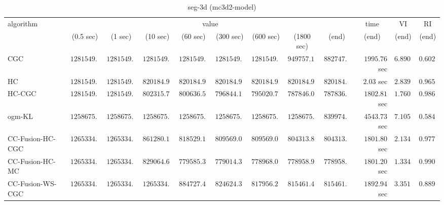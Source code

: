 \begin{table}[H]
\scriptsize
\centering
\caption{seg-3d (mc3d2-model)}
\label{tab:anytimetable-seg-3d-mc3d2-model}
\begin{tabular}{lrrrrrrrrrrr}
\toprule
           algorithm &                                   \multicolumn{8}{c}{value} & \multicolumn{1}{c}{time}    & \multicolumn{1}{c}{VI}  & \multicolumn{1}{c}{RI} \\  
\cmidrule(lr){2-9}\cmidrule(lr){10-10} \cmidrule(lr){11-11} \cmidrule(lr){12-12}   
                     & \multicolumn{1}{c}{(0.5 sec)} & \multicolumn{1}{c}{(1 sec)} & \multicolumn{1}{c}{(10 sec)} & \multicolumn{1}{c}{(60 sec)} & \multicolumn{1}{c}{(300 sec)} & \multicolumn{1}{c}{(600 sec)} & \multicolumn{1}{c}{(1800 sec)} & \multicolumn{1}{c}{(end)} & \multicolumn{1}{c}{(end)}    & \multicolumn{1}{c}{(end)}   & \multicolumn{1}{c}{(end)}  \\ \midrule 
                 CGC & $   1281549.37$ & $   1281549.37$ & $   1281549.37$ & $   1281549.37$ & $   1281549.37$ & $   1281549.37$ & $    949757.11$ & $    882747.02$ & $      1995.76$ sec    & $       6.8908$  & $       0.6024$ \\ 
                  HC & $   1281549.37$ & $   1281549.37$ & $    820184.98$ & $    820184.98$ & $    820184.98$ & $    820184.98$ & $    820184.98$ & $    820184.98$ & $         2.03$ sec    & $       2.8395$  & $       0.9651$ \\ 
              HC-CGC & $   1281549.37$ & $   1281549.37$ & $    802315.77$ & $    800636.51$ & $    796844.12$ & $    795020.78$ & $    787846.06$ & $    787836.19$ & $      1802.81$ sec    & $       1.7603$  & $       0.9861$ \\ 
              ogm-KL & $   1258675.53$ & $   1258675.53$ & $   1258675.53$ & $   1258675.53$ & $   1258675.53$ & $   1258675.53$ & $   1258675.53$ & $    839974.05$ & $      4543.73$ sec    & $       7.1057$  & $       0.5849$ \\ 
    CC-Fusion-HC-CGC & $   1265334.24$ & $   1265334.24$ & $    861280.16$ & $    818529.13$ & $    809569.07$ & $    809569.07$ & $    804313.81$ & $    804313.81$ & $      1801.80$ sec    & $       2.1347$  & $       0.9775$ \\ 
     CC-Fusion-HC-MC & $   1265334.24$ & $   1265334.24$ & $    829064.68$ & $    779585.33$ & $    779014.36$ & $    778968.07$ & $    778958.97$ & $    778958.97$ & $      1801.20$ sec    & $       1.3347$  & $       0.9906$ \\ 
    CC-Fusion-WS-CGC & $   1265334.24$ & $   1265334.24$ & $   1265334.24$ & $    884727.49$ & $    824624.32$ & $    817956.21$ & $    815461.43$ & $    815461.43$ & $      1892.94$ sec    & $       3.3514$  & $       0.8895$ \\ 

\end{tabular}
\end{table}
